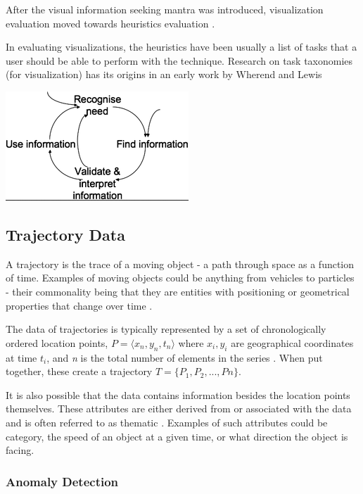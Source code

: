 \documentclass{article}
\begin{document}
After the visual information seeking mantra was introduced, visualization evaluation moved towards heuristics evaluation \cite{Freitas2014}. 

In evaluating visualizations, the heuristics have been usually a list of tasks that a user should be able to perform with the technique. Research on task taxonomies (for visualization) has its origins in an early work by Wherend and Lewis 

\includegraphics{loop1.png}






\subsection{Trajectory Data}


A trajectory is the trace of a moving object - a path through space as a function of time. 
Examples of moving objects could be anything from vehicles to particles - their commonality being that they are entities with positioning or geometrical properties that change over time \cite{Tradef2}. 

The data of trajectories is typically represented by a set of chronologically ordered location points, $ P = \langle x_{n}, y_{n}, t_{n} \rangle $ where $x_{i}, y_{i}$ are geographical coordinates at time $t_{i}$, and \emph{n} is the total number of elements in the series \cite{Tradef1}. When put together, these create a trajectory $ T = \{ P_{1}, P_{2},...,P{n} \} $. 

It is also possible that the data contains information besides the location points themselves. These attributes are either derived from or associated with the data and is often referred to as thematic \cite{Ref1}. Examples of such attributes could be category, the speed of an object at a given time, or what direction the object is facing.  


\subsubsection{Anomaly Detection}
\end{document}
